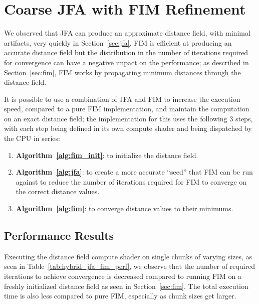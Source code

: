 \section{Coarse JFA with FIM Refinement} \label{sec:hybrid_jfa_fim}
We observed that JFA can produce an approximate distance field, with minimal artifacts, very quickly in
Section~\ref{sec:jfa}. FIM is efficient at producing an accurate distance field but the distribution in the number of
iterations required for convergence can have a negative impact on the performance; as described in
Section~\ref{sec:fim}, FIM works by propagating minimum distances through the distance field.

It is possible to use a combination of JFA and FIM to increase the execution speed, compared to a pure FIM
implementation, and maintain the computation on an exact distance field; the implementation for this uses the following
3 steps, with each step being defined in its own compute shader and being dispatched by the CPU in series:

\begin{enumerate}
    \item \textbf{Algorithm~\ref{alg:fim_init}}: to initialize the distance field.
    \item \textbf{Algorithm~\ref{alg:jfa}}: to create a more accurate ``seed'' that FIM can be run against to reduce the
          number of iterations required for FIM to converge on the correct distance values.
    \item \textbf{Algorithm~\ref{alg:fim}}: to converge distance values to their minimums.
\end{enumerate}

\subsection{Performance Results}
Executing the distance field compute shader on single chunks of varying sizes, as seen in
Table~\ref{tab:hybrid_jfa_fim_perf}, we observe that the number of required iterations to achieve convergence is
decreased compared to running FIM on a freshly initialized distance field as seen in Section~\ref{sec:fim}. The total
execution time is also less compared to pure FIM, especially as chunk sizes get larger.

